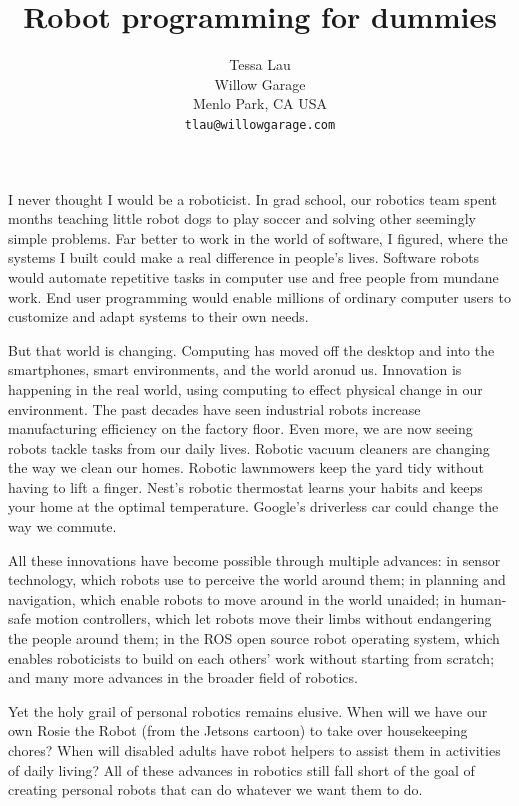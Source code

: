 \documentclass{article}
\begin{document}
\title {Robot programming for dummies}
\author {Tessa Lau \\
Willow Garage \\
Menlo Park, CA USA \\
{\tt tlau@willowgarage.com}
}
\maketitle

I never thought I would be a roboticist. In grad school, our robotics team spent months teaching little robot dogs to play soccer and solving other seemingly simple problems. Far better to work in the world of software, I figured, where the systems I built could make a real difference in people's lives. Software robots would automate repetitive tasks in computer use and free people from mundane work. End user programming would enable millions of ordinary computer users to customize and adapt systems to their own needs.

But that world is changing. Computing has moved off the desktop and into the smartphones, smart environments, and the world aronud us. Innovation is happening in the real world, using computing to effect physical change in our environment. The past decades have seen industrial robots increase manufacturing efficiency on the factory floor. Even more, we are now seeing robots tackle tasks from our daily lives. Robotic vacuum cleaners are changing the way we clean our homes. Robotic lawnmowers keep the yard tidy without having to lift a finger. Nest's robotic thermostat learns your habits and keeps your home at the optimal temperature. Google's driverless car could change the way we commute.

All these innovations have become possible through multiple advances: in sensor technology, which robots use to perceive the world around them; in planning and navigation, which enable robots to move around in the world unaided; in human-safe motion controllers, which let robots move their limbs without endangering the people around them; in the ROS open source robot operating system, which enables roboticists to build on each others' work without starting from scratch; and many more advances in the broader field of robotics.

Yet the holy grail of personal robotics remains elusive. When will we have our own Rosie the Robot (from the Jetsons cartoon) to take over housekeeping chores? When will disabled adults have robot helpers to assist them in activities of daily living? All of these advances in robotics still fall short of the goal of creating personal robots that can do whatever we want them to do.
\end{document}
